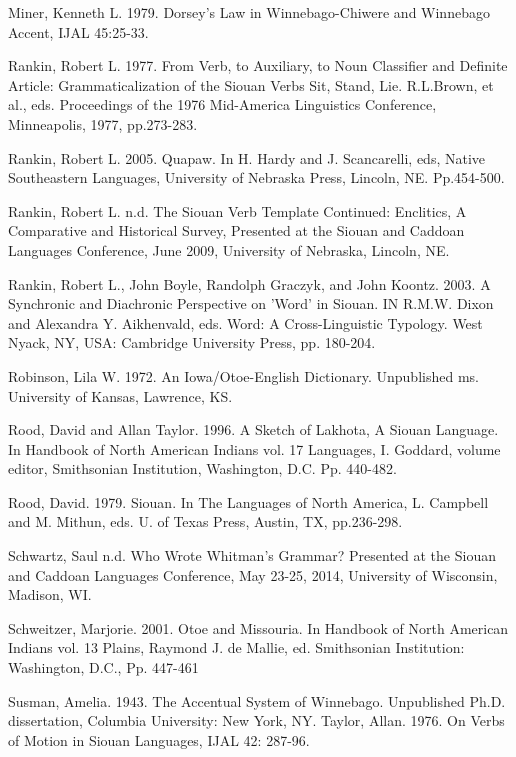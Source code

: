 \documentclass[output=paper]{LSP/langsci}
\begin{document}
\begin{reflist}
Miner, Kenneth L. 1979. Dorsey's Law in Winnebago-Chiwere and Winnebago Accent, IJAL 45:25-33.   	
	            	 					
Rankin, Robert L.  1977.  From Verb, to Auxiliary, to Noun Classifier and Definite Article: Grammaticalization of the Siouan Verbs Sit, Stand, Lie. R.L.Brown, et al., eds. Proceedings of the 1976 Mid-America Linguistics Conference, Minneapolis, 1977, pp.273-283.    
  
Rankin, Robert L.  2005.  Quapaw. In H. Hardy and J. Scancarelli, eds, Native Southeastern Languages, University of Nebraska Press, Lincoln, NE.  Pp.454-500.		         	
             
Rankin, Robert L.  n.d.  The Siouan Verb Template Continued: Enclitics, A Comparative and Historical Survey, Presented at the Siouan and Caddoan Languages Conference, June 2009, 	University of Nebraska, Lincoln, NE. 
  
Rankin, Robert L., John Boyle, Randolph Graczyk, and John Koontz. 2003.  A Synchronic and Diachronic Perspective on 'Word' in Siouan.  IN R.M.W. Dixon and Alexandra Y. Aikhenvald, eds. Word:  A Cross-Linguistic Typology. West Nyack, NY, USA:  Cambridge University Press, pp. 180-204.							     					     			          
 
Robinson, Lila W. 1972.  An Iowa/Otoe-English Dictionary. Unpublished ms. University of Kansas, Lawrence, KS.  
 
Rood, David and Allan Taylor. 1996.  A Sketch of Lakhota, A Siouan Language. In Handbook of North American Indians vol. 17 Languages, I. Goddard, volume editor, Smithsonian Institution, Washington, D.C.  Pp. 440-482.  	

Rood, David.  1979.  Siouan. In The Languages of North America, L. Campbell and M. Mithun, eds.  U. of Texas Press, Austin, TX, pp.236-298.  
			          		           			           
Schwartz, Saul  n.d. Who Wrote Whitman's Grammar?  Presented at the Siouan and Caddoan Languages Conference, May 23-25, 2014, University of Wisconsin, Madison, WI.	  
 
Schweitzer, Marjorie. 2001. Otoe and Missouria. In Handbook of North American Indians vol. 13 Plains,  Raymond J. de Mallie, ed.  Smithsonian Institution:  Washington, D.C., Pp. 447-461           
 
 Susman, Amelia. 1943. The Accentual System of Winnebago. Unpublished Ph.D. dissertation, Columbia University: New York, NY.  								              
Taylor, Allan. 1976.  On Verbs of Motion in Siouan Languages, IJAL 42: 287-96. 	            
 

\end{reflist}
\end{document}
